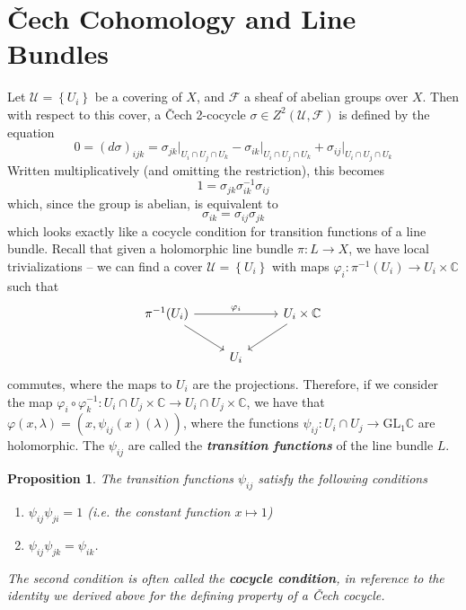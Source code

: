 \documentclass[psamsfonts, 12pt]{amsart}
\newtheorem{prop}[thm]{Proposition}
\theoremstyle{definition}
\theoremstyle{remark}
\newcommand{\ib}[1]{\textbf{\textit{#1}}}
\newcommand{\C}{\mathbb{C}}
\newcommand{\GL}{\mathrm{GL}}
\newcommand{\inv}{^{-1}}
\newcommand{\set}[1]{\left\lbrace #1 \right\rbrace}
\begin{document}
\section{\v{C}ech Cohomology and Line Bundles}
%
Let $\mathcal{U} = \set{U_i}$ be a covering of $X$, and $\mathcal{F}$ a sheaf
of abelian groups over $X$. Then with respect to this cover, a \v{C}ech 2-cocycle
$\sigma \in Z^2(\mathcal{U}, \mathcal{F})$ is defined by the equation
\[
0 = (d\sigma)_{ijk} = \sigma_{jk}\vert_{U_i \cap U_j \cap U_k}
- \sigma_{ik}\vert_{U_i \cap U_j \cap U_k} + \sigma_{ij}\vert_{U_i \cap U_j \cap U_k}
\]
Written multiplicatively (and omitting the restriction), this becomes
\[
1 = \sigma_{jk}\sigma_{ik}\inv\sigma_{ij}
\]
which, since the group is abelian, is equivalent to
\[
\sigma_{ik} = \sigma_{ij}\sigma_{jk}
\]
which looks exactly like a cocycle condition for transition functions of a line
bundle. Recall that given a holomorphic line bundle $\pi : L \to X$, we have local
trivializations -- we can find a cover $\mathcal{U} = \set{U_i}$ with maps
$\varphi_i : \pi\inv(U_i) \to U_i \times \C$ such that
\[\begin{tikzcd}
\pi\inv(U_i) \ar[rr, "\varphi_i"] \ar[dr] & & U_i \times \C \ar[dl] \\
& U_i
\end{tikzcd}\]
commutes, where the maps to $U_i$ are the projections. Therefore, if we consider
the map
$\varphi_i \circ \varphi_k\inv : U_i \cap U_j \times \C \to U_i \cap U_j \times \C$,
we have that $\varphi(x, \lambda) = (x, \psi_{ij}(x)(\lambda))$, where the functions
$\psi_{ij} : U_i\cap U_j \to \GL_1\C$ are holomorphic. The $\psi_{ij}$
are called the \ib{transition functions} of the line bundle $L$.
%
\begin{prop}
The transition functions $\psi_{ij}$ satisfy the following conditions
\begin{enumerate}
  \item $\psi_{ij}\psi_{ji} = 1$ (i.e. the constant function $x \mapsto 1$)
  \item $\psi_{ij}\psi_{jk} = \psi_{ik}$.
\end{enumerate}
The second condition is often called the \ib{cocycle condition}, in reference to the
identity we derived above for the defining property of a \v{C}ech cocycle.
\end{prop}
%
\end{document}
